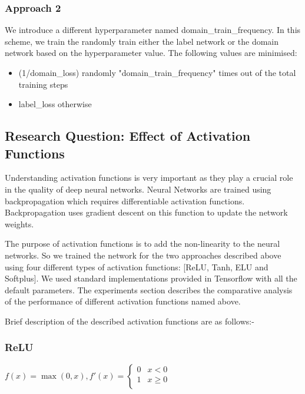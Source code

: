 \documentclass[11pt,a4paper]{article}
\begin{document}
\subsubsection{Approach 2}
We introduce a different hyperparameter named domain\_train\_frequency. In this scheme, we train the randomly train either the label network or the domain network based on the hyperparameter value. The following values are minimised:

\begin{itemize}
  \item (1/domain\_loss) randomly "domain\_train\_frequency" times out of the total training steps
  \item label\_loss otherwise
\end{itemize}

\subsection{Research Question: Effect of Activation Functions}
Understanding activation functions is very important as they play a crucial role in the quality of deep neural networks. Neural Networks are trained using backpropagation which requires differentiable activation functions. Backpropagation uses gradient descent on this function to update the network weights.

The purpose of activation functions is to add the non-linearity to the neural networks. So we trained the network for the two approaches described above using four different types of activation functions: [ReLU, Tanh, ELU and Softplus].
We used standard implementations provided in Tensorflow with all the default parameters. The experiments section describes the comparative analysis of the performance of different activation functions named above.

Brief description of the described activation functions are as follows:-
\subsubsection{ReLU}
$f(x)= \max(0,x), f'(x) = \begin{cases}
      0 & x < 0 \\
      1 & x\geq 0 \\
   \end{cases}$
\end{document}
